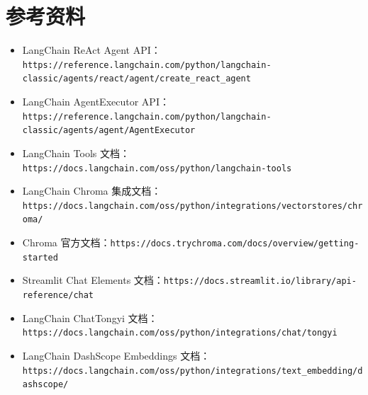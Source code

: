 \documentclass[UTF8,zihao=-4]{ctexart}
\begin{document}
\section{参考资料}

\begin{itemize}
\item LangChain ReAct Agent API：\texttt{https://reference.langchain.com/python/langchain-classic/agents/react/agent/create\_react\_agent}
\item LangChain AgentExecutor API：\texttt{https://reference.langchain.com/python/langchain-classic/agents/agent/AgentExecutor}
\item LangChain Tools 文档：\texttt{https://docs.langchain.com/oss/python/langchain-tools}
\item LangChain Chroma 集成文档：\texttt{https://docs.langchain.com/oss/python/integrations/vectorstores/chroma/}
\item Chroma 官方文档：\texttt{https://docs.trychroma.com/docs/overview/getting-started}
\item Streamlit Chat Elements 文档：\texttt{https://docs.streamlit.io/library/api-reference/chat}
\item LangChain ChatTongyi 文档：\texttt{https://docs.langchain.com/oss/python/integrations/chat/tongyi}
\item LangChain DashScope Embeddings 文档：\texttt{https://docs.langchain.com/oss/python/integrations/text\_embedding/dashscope/}
\end{itemize}
\end{document}
